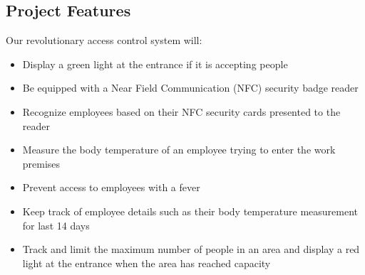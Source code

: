 \subsection{Project Features}

Our revolutionary access control system will:
\begin{itemize}
    \item Display a green light at the entrance if it is accepting people
    \item Be equipped with a Near Field Communication (NFC) security badge
          reader
    \item Recognize employees based on their NFC security cards presented to
          the reader 
    \item Measure the body temperature of an employee trying to enter the work
          premises 
    \item Prevent access to employees with a fever
    \item Keep track of employee details such as their body temperature
          measurement for last 14 days
    \item Track and limit the maximum number of people in an area and display a
          red light at the entrance when the area has reached capacity
\end{itemize}

